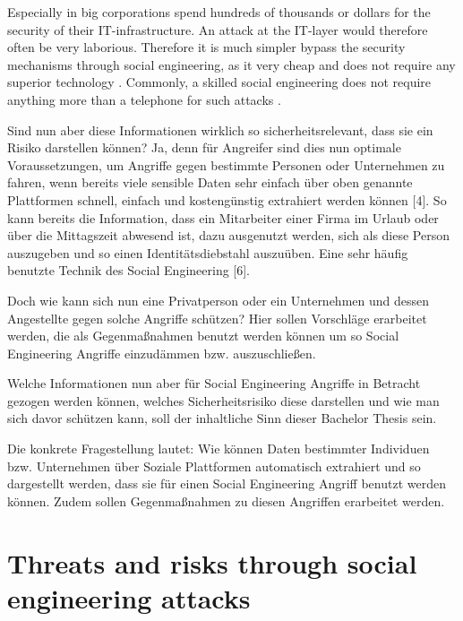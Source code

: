 Especially in big corporations spend hundreds of thousands or dollars for the
security of their IT-infrastructure. An attack at the IT-layer would therefore
often be very laborious. Therefore it is much simpler bypass the security
mechanisms through social engineering, as it very cheap and does not require
any superior technology \cite{winkler1995}. Commonly, a skilled social
engineering does not require anything more than a telephone for such attacks
\cite{mitnick2003}.


Sind nun aber diese Informationen wirklich so sicherheitsrelevant, dass sie ein
Risiko darstellen können? Ja, denn für Angreifer sind dies nun optimale
Voraussetzungen, um Angriffe gegen bestimmte Personen oder Unternehmen zu
fahren, wenn bereits viele sensible Daten sehr einfach über oben genannte
Plattformen schnell, einfach und kostengünstig extrahiert werden können [4]. So
kann bereits die Information, dass ein Mitarbeiter einer Firma im Urlaub oder
über die Mittagszeit abwesend ist, dazu ausgenutzt werden, sich als diese
Person auszugeben und so einen Identitätsdiebstahl auszuüben. Eine sehr häufig
benutzte Technik des Social Engineering [6].

Doch wie kann sich nun eine Privatperson oder ein Unternehmen und dessen
Angestellte gegen solche Angriffe schützen? Hier sollen Vorschläge erarbeitet
werden, die als Gegenmaßnahmen benutzt werden können um so Social Engineering
Angriffe einzudämmen bzw. auszuschließen.

Welche Informationen nun aber für Social Engineering Angriffe in Betracht
gezogen werden können, welches Sicherheitsrisiko diese darstellen und wie man
sich davor schützen kann, soll der inhaltliche Sinn dieser Bachelor Thesis
sein.

Die konkrete Fragestellung lautet: \glqq{}Wie können Daten bestimmter
Individuen bzw. Unternehmen über Soziale Plattformen automatisch extrahiert
und so dargestellt werden, dass sie für einen Social Engineering Angriff
benutzt werden können. Zudem sollen Gegenmaßnahmen zu diesen Angriffen
erarbeitet werden.\grqq{}


\section{Threats and risks through social engineering attacks}
